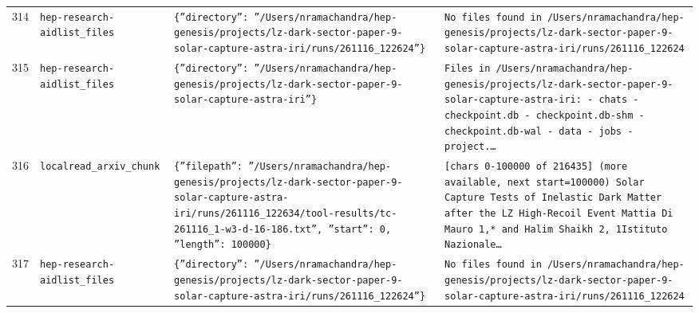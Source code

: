 \documentclass[11pt,a4paper]{article}
\begin{document}
\begin{longtable}{@{}p{}p{}p{}p{}@{}}
314 & \texttt{hep-research-aid}\newline\texttt{list\_\allowbreak{}files} & \texttt{\{''directory'':\allowbreak{} ''/\allowbreak{}Users/\allowbreak{}nramachandra/\allowbreak{}hep-genesis/\allowbreak{}projects/\allowbreak{}lz-dark-sector-paper-9-solar-capture-astra-iri/\allowbreak{}runs/\allowbreak{}261116\_\allowbreak{}122624''\}\allowbreak{}} & \texttt{No files found in /\allowbreak{}Users/\allowbreak{}nramachandra/\allowbreak{}hep-genesis/\allowbreak{}projects/\allowbreak{}lz-dark-sector-paper-9-solar-capture-astra-iri/\allowbreak{}runs/\allowbreak{}261116\_\allowbreak{}122624} \\
315 & \texttt{hep-research-aid}\newline\texttt{list\_\allowbreak{}files} & \texttt{\{''directory'':\allowbreak{} ''/\allowbreak{}Users/\allowbreak{}nramachandra/\allowbreak{}hep-genesis/\allowbreak{}projects/\allowbreak{}lz-dark-sector-paper-9-solar-capture-astra-iri''\}\allowbreak{}} & \texttt{Files in /\allowbreak{}Users/\allowbreak{}nramachandra/\allowbreak{}hep-genesis/\allowbreak{}projects/\allowbreak{}lz-dark-sector-paper-9-solar-capture-astra-iri:\allowbreak{}   - chats   - checkpoint.db   - checkpoint.db-shm   - checkpoint.db-wal   - data   - jobs   - project.\ldots{}\allowbreak{}} \\
316 & \texttt{local}\newline\texttt{read\_\allowbreak{}arxiv\_\allowbreak{}chunk} & \texttt{\{''filepath'':\allowbreak{} ''/\allowbreak{}Users/\allowbreak{}nramachandra/\allowbreak{}hep-genesis/\allowbreak{}projects/\allowbreak{}lz-dark-sector-paper-9-solar-capture-astra-iri/\allowbreak{}runs/\allowbreak{}261116\_\allowbreak{}122634/\allowbreak{}tool-results/\allowbreak{}tc-261116\_\allowbreak{}1-w3-d-16-186.txt'',\allowbreak{} ''start'':\allowbreak{} 0,\allowbreak{} ''length'':\allowbreak{} 100000\}\allowbreak{}} & \texttt{[chars 0-100000 of 216435]\allowbreak{} (more available,\allowbreak{} next start=\allowbreak{}100000)\allowbreak{}  Solar Capture Tests of Inelastic Dark Matter after the LZ High-Recoil Event Mattia Di Mauro 1,\allowbreak{}* and Halim Shaikh 2,\allowbreak{}\dag{}\allowbreak{} 1Istituto Nazionale\ldots{}\allowbreak{}} \\
317 & \texttt{hep-research-aid}\newline\texttt{list\_\allowbreak{}files} & \texttt{\{''directory'':\allowbreak{} ''/\allowbreak{}Users/\allowbreak{}nramachandra/\allowbreak{}hep-genesis/\allowbreak{}projects/\allowbreak{}lz-dark-sector-paper-9-solar-capture-astra-iri/\allowbreak{}runs/\allowbreak{}261116\_\allowbreak{}122624''\}\allowbreak{}} & \texttt{No files found in /\allowbreak{}Users/\allowbreak{}nramachandra/\allowbreak{}hep-genesis/\allowbreak{}projects/\allowbreak{}lz-dark-sector-paper-9-solar-capture-astra-iri/\allowbreak{}runs/\allowbreak{}261116\_\allowbreak{}122624} \\

\end{longtable}
\end{document}
